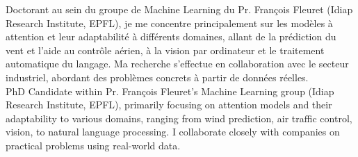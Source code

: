 \commonvspace
\color{deepgray}
\small
\ifFrench
Doctorant au sein du groupe de Machine Learning du Pr. François Fleuret (Idiap Research Institute, EPFL), je me concentre principalement sur les modèles à attention et leur adaptabilité à différents domaines, allant de la prédiction du vent et l'aide au contrôle aérien, à la vision par ordinateur et le traitement automatique du langage. Ma recherche s'effectue en collaboration avec le secteur industriel, abordant des problèmes concrets à partir de données réelles.
 \\
\else
  PhD Candidate within Pr. François Fleuret's Machine Learning group (Idiap Research Institute, EPFL), primarily focusing on attention models and their adaptability to various domains, ranging from wind prediction, air traffic control, vision, to natural language processing. I collaborate closely with companies on practical problems using real-world data.\\
\fi
\color{deepgray}